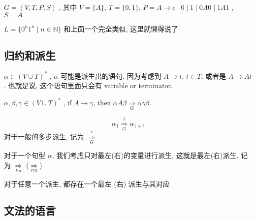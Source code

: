 \documentclass[../main.tex]{subfiles}
\begin{document}
\begin{exam}[\(0,1\) 组成的回文]
	\(G = (V , T , P , S ) \) , 其中 \(V = \{ A \} \), \(T = \{ 0 , 1 \} \), \(P = A \to \epsilon \mid 0 \mid 1\mid  0A 0 \mid 1 A1\) , \(S = A\)
\end{exam}
\begin{exam}[\(0 ^{n}1 ^{n}\)]
	\(L = \{  0 ^{ n} 1 ^{n} \mid n \in \mathbb{N} \} \)
	和上面一个完全类似, 这里就懒得说了
\end{exam}

\subsection{归约和派生}
\begin{definition}[文法派生的句型]
\(\alpha \in (V \cup T ) ^{*} \) , \(\alpha\) 可能是派生出的语句. 
因为考虑到 \(A \to t\), \(t \in T\), 或者是 \(A \to A t \) . 也就是说, 这个语句里面只会有 variable or terminator.
\end{definition}

\begin{definition}[归约]
\end{definition}

\begin{definition}[派生]
	\(\alpha ,\beta , \gamma \in (V \cup T ) ^{*}\) , if \(A \to \gamma\), then \( \alpha A\beta \underset{G}{\Rightarrow}\alpha \gamma\beta\). 
\end{definition}
\begin{exam}[派生的例子]
\end{exam}

\begin{definition}[多步派生]
	\begin{equation}
		\alpha_{1} \overset{i}{\underset{G}{\Rightarrow}} \alpha _{1 + i}
	\end{equation}
	对于一般的多步派生, 记为 \(\overset{*}{\underset{G}{\Rightarrow}}\)
\end{definition}

\begin{definition}
	对于一个句型 \(\alpha\), 我们考虑只对最左(右)的变量进行派生, 这就是最左(右)派生. 记为 \(\underset{lm}{\Rightarrow}\) (\(\underset{rm}{\Rightarrow}\))
\end{definition}
\begin{thm}
对于任意一个派生, 都存在一个最左 (右) 派生与其对应
\end{thm}

\subsection{文法的语言}
\end{document}
